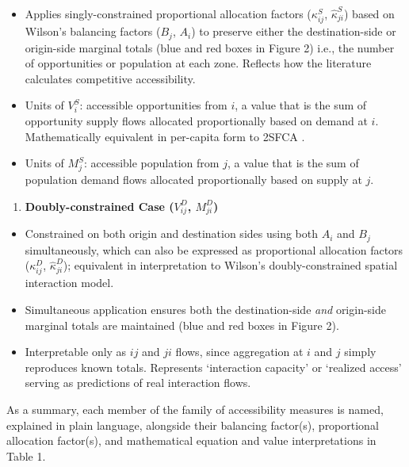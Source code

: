 \documentclass[
  10pt,
  letterpaper,
]{article}
\providecommand{\tightlist}{%
  \setlength{\itemsep}{0pt}\setlength{\parskip}{0pt}}
\begin{document}
\begin{itemize}
\tightlist
\item
  Applies singly-constrained proportional allocation factors
  (\(\kappa_{ij}^S\), \(\hat \kappa_{ji}^S\)) based on Wilson's
  balancing factors (\(B_j\), \(A_i\)) to preserve either the
  destination-side or origin-side marginal totals (blue and red boxes in
  Figure 2) i.e., the number of opportunities or population at each
  zone. Reflects how the literature calculates competitive
  accessibility.
\item
  Units of \(V_i^S\): accessible opportunities from \(i\), a value that
  is the sum of opportunity supply flows allocated proportionally based
  on demand at \(i\). Mathematically equivalent in per-capita form to
  2SFCA \citep{luo2003}.
\item
  Units of \(M_j^S\): accessible population from \(j\), a value that is
  the sum of population demand flows allocated proportionally based on
  supply at \(j\).
\end{itemize}

\begin{enumerate}
\def\labelenumi{\arabic{enumi}.}
\setcounter{enumi}{3}
\tightlist
\item
  \textbf{Doubly-constrained Case (\(V_{ij}^D\), \(M_{ji}^D\))}
\end{enumerate}

\begin{itemize}
\tightlist
\item
  Constrained on both origin and destination sides using both \(A_i\)
  and \(B_j\) simultaneously, which can also be expressed as
  proportional allocation factors (\(\kappa_{ij}^D\),
  \(\hat \kappa_{ji}^D\)); equivalent in interpretation to Wilson's
  \citep{wilson1971} doubly-constrained spatial interaction model.
\item
  Simultaneous application ensures both the destination-side \emph{and}
  origin-side marginal totals are maintained (blue and red boxes in
  Figure 2).
\item
  Interpretable only as \(ij\) and \(ji\) flows, since aggregation at
  \(i\) and \(j\) simply reproduces known totals. Represents
  `interaction capacity' or `realized access' serving as predictions of
  real interaction flows.
\end{itemize}

As a summary, each member of the family of accessibility measures is
named, explained in plain language, alongside their balancing factor(s),
proportional allocation factor(s), and mathematical equation and value
interpretations in Table 1.
\end{document}
